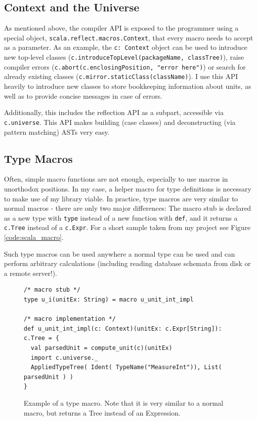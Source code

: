 \documentclass[12pt,oneside,a4paper]{scrbook}
\begin{document}
\subsection{Context and the Universe}

As mentioned above, the compiler API is exposed to the programmer using a special object, \verb|scala.reflect.macros.Context|, that every macro needs to accept as a parameter. As an example, the \verb|c: Context| object can be used to introduce new top-level classes (\verb|c.introduceTopLevel(packageName, classTree)|), raise compiler errors (\verb|c.abort(c.enclosingPosition, "error here")|) or search for already existing classes (\verb|c.mirror.staticClass(className)|). I use this API heavily to introduce new classes to store bookkeeping information about units, as well as to provide concise messages in case of errors.

Additionally, this includes the reflection API as a subpart, accessible via \verb|c.universe|. This API makes building (case classes) and deconstructing (via pattern matching) ASTs very easy.

\subsection{Type Macros}

Often, simple macro functions are not enough, especially to use macros in unorthodox positions. In my case, a helper macro for type definitions is necessary to make use of my library viable. In practice, type macros are very similar to normal macros - there are only two major differences: The macro stub is declared as a new type with \verb|type| instead of a new function with \verb|def|, and it returns a \verb|c.Tree| instead of a \verb|c.Expr|. For a short sample taken from my project see Figure \ref{code:scala_macro}.

Such type macros can be used anywhere a normal type can be used and can perform arbitrary calculations (including reading database schemata from disk or a remote server!).

\begin{figure}
\begin{verbatim}
/* macro stub */
type u_i(unitEx: String) = macro u_unit_int_impl

/* macro implementation */
def u_unit_int_impl(c: Context)(unitEx: c.Expr[String]): c.Tree = {
  val parsedUnit = compute_unit(c)(unitEx)
  import c.universe._
  AppliedTypeTree( Ident( TypeName("MeasureInt")), List( parsedUnit ) )
}
\end{verbatim}
\caption{Example of a type macro. Note that it is very similar to a normal macro, but returns a Tree instead of an Expression.}
\label{code:scala_typemacro}
\end{figure}
\end{document}
